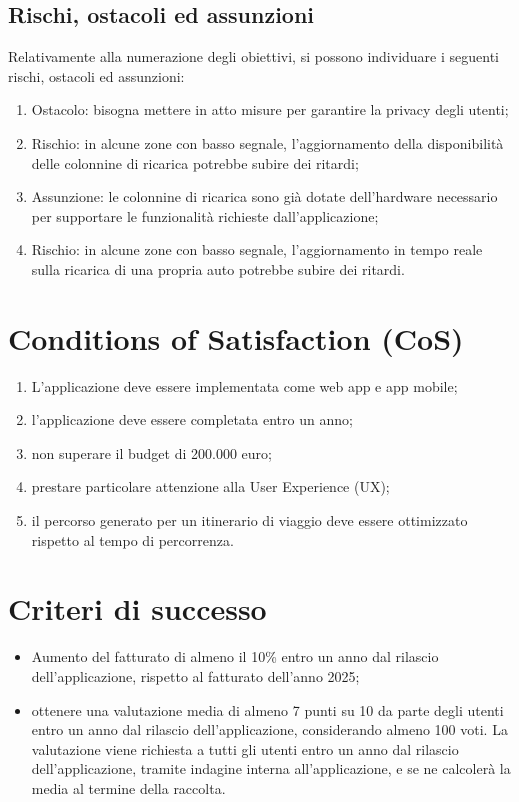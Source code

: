 \documentclass[a4paper,12pt]{article}
\begin{document}
\subsection{Rischi, ostacoli ed assunzioni}

Relativamente alla numerazione degli obiettivi, si possono individuare i seguenti rischi, ostacoli ed assunzioni:
\begin{enumerate}
    \item Ostacolo: bisogna mettere in atto misure per garantire la privacy degli utenti;
    \item Rischio: in alcune zone con basso segnale, l'aggiornamento della disponibilità delle colonnine di ricarica
    potrebbe subire dei ritardi;
    \item Assunzione: le colonnine di ricarica sono già dotate dell'hardware necessario per supportare le funzionalità
    richieste dall'applicazione;
    \item Rischio: in alcune zone con basso segnale, l'aggiornamento in tempo reale sulla ricarica di una propria auto
    potrebbe subire dei ritardi.
\end{enumerate}

\section{Conditions of Satisfaction (CoS)}
\begin{enumerate}
    \item L'applicazione deve essere implementata come web app e app mobile;
    \item l'applicazione deve essere completata entro un anno;
    \item non superare il budget di 200.000 euro;
    \item prestare particolare attenzione alla User Experience (UX);
    \item il percorso generato per un itinerario di viaggio deve essere ottimizzato rispetto al tempo di percorrenza.
\end{enumerate}

\section{Criteri di successo}
\begin{itemize}
    \item Aumento del fatturato di almeno il 10\% entro un anno dal rilascio dell'applicazione, rispetto al fatturato
    dell'anno 2025;
    \item ottenere una valutazione media di almeno 7 punti su 10 da parte degli utenti entro un anno dal rilascio
    dell'applicazione, considerando almeno 100 voti. La valutazione viene richiesta a tutti gli utenti entro un anno
    dal rilascio dell'applicazione, tramite indagine interna all'applicazione, e se ne calcolerà la media al termine
    della raccolta.
\end{itemize}
\end{document}
